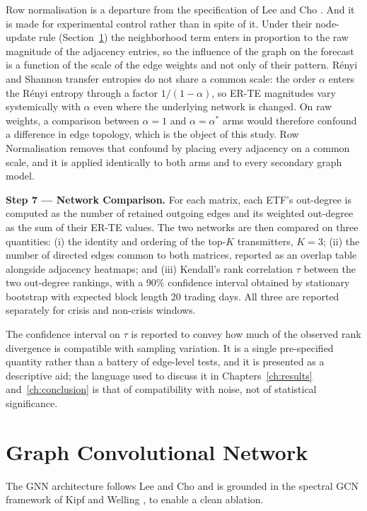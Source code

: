 \documentclass[12pt,oneside]{report}
\begin{document}
Row normalisation is a departure from the specification of Lee and Cho
\cite{lee2025}. And it is made for experimental control rather than in
spite of it. Under their node-update rule (Section~\ref{sec:gcn}) the
neighborhood term enters in proportion to the raw magnitude of the
adjacency entries, so the influence of the graph on the forecast is a
function of the scale of the edge weights and not only of their pattern.
Rényi and Shannon transfer entropies do not share a common scale: the
order $\alpha$ enters the Rényi entropy through a factor
$1/(1-\alpha)$, so ER-TE magnitudes vary systemically with $\alpha$ even
where the underlying network is changed. On raw weights, a comparison
between $\alpha = 1$ and $\alpha = \alpha^{*}$ arms would therefore
confound a difference in edge topology, which is the object of this
study. Row Normalisation removes that confound by placing every
adjacency on a common scale, and it is applied identically to both arms
and to every secondary graph model.

\textbf{Step 7 --- Network Comparison.} For each matrix, each ETF's
out-degree is computed as the number of retained outgoing edges and its
weighted out-degree as the sum of their ER-TE values. The two networks
are then compared on three quantities: (i) the identity and ordering of
the top-$K$ transmitters, $K = 3$; (ii) the number of directed edges
common to both matrices, reported as an overlap table alongside
adjacency heatmaps; and (iii) Kendall's rank correlation $\tau$
\cite{kendall1938} between the two out-degree rankings, with a 90\%
confidence interval obtained by stationary bootstrap \cite{politis1994}
with expected block length 20 trading days. All three are reported
separately for crisis and non-crisis windows.

The confidence interval on $\tau$ is reported to convey how much of the
observed rank divergence is compatible with sampling variation. It is a
single pre-specified quantity rather than a battery of edge-level tests,
and it is presented as a descriptive aid; the language used to discuss
it in Chapters~\ref{ch:results} and~\ref{ch:conclusion} is that of
compatibility with noise, not of statistical significance.

\section{Graph Convolutional Network}\label{sec:gcn}

The GNN architecture follows Lee and Cho \cite{lee2025} and is grounded
in the spectral GCN framework of Kipf and Welling \cite{kipf2017}, to
enable a clean ablation.
\end{document}
